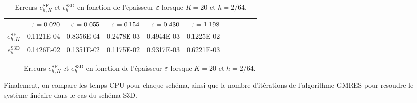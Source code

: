 \begin{table}[t]
  \caption{Erreurs $e_{h,K}^\mathrm{SF}$ et $e_h^\mathrm{S3D}$ en fonction
    de l'épaisseur $\varepsilon$ lorsque $K = 20$ et $h = 2/64$.}
  \label{tab:e-sf-e-s3d-convergence}
  \begin{center}
    \begin{tabular}{@{}rrrrrrrrrrr@{}}
      \toprule
      & $\varepsilon = 0.020$
      & $\varepsilon = 0.055$
      & $\varepsilon = 0.154$
      & $\varepsilon = 0.430$
      & $\varepsilon = 1.198$ \\
      \cmidrule{2-6}
      $e_{h,K}^\mathrm{SF}$  & \num{0.1121E-04} & \num{0.8356E-04} & \num{0.2478E-03} & \num{0.4944E-03} & \num{0.1225E-02}\\
      $e_h^\mathrm{S3D}$ & \num{0.1426E-02} & \num{0.1351E-02} & \num{0.1175E-02} & \num{0.9317E-03} & \num{0.6221E-03}\\
      \bottomrule
    \end{tabular}
  \end{center}
\end{table}

\begin{figure}
  \begin{center}
    
    \caption{Erreurs $e_{h,K}^\mathrm{SF}$ et $e_h^\mathrm{S3D}$ en fonction
    de l'épaisseur $\varepsilon$ lorsque $K = 20$ et $h = 2/64$.}
    \label{fig:e-sf-e-s3d-convergence}
  \end{center}
\end{figure}

Finalement, on compare les temps CPU pour chaque schéma, ainsi
que le nombre d'itérations de l'algorithme GMRES pour résoudre le
système linéaire dans le cas du schéma S3D.

